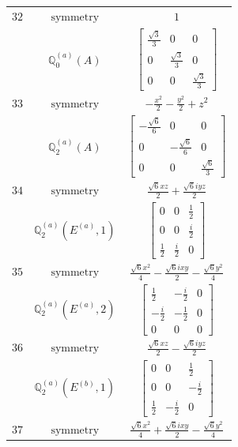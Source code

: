 \documentclass[fleqn,8pt,landscape]{jsarticle}
\begin{document}
\begin{longtable}{ccc}
$ 32 $ & $ \text{symmetry} $ & $ 1 $ \\
$  $ & $ \mathbb{Q}_{0}^{(a)}(A) $ & $ \begin{bmatrix} \frac{\sqrt{3}}{3} & 0 & 0 \\ 0 & \frac{\sqrt{3}}{3} & 0 \\ 0 & 0 & \frac{\sqrt{3}}{3} \end{bmatrix} $ \\ \hline
$ 33 $ & $ \text{symmetry} $ & $ - \frac{x^{2}}{2} - \frac{y^{2}}{2} + z^{2} $ \\
$  $ & $ \mathbb{Q}_{2}^{(a)}(A) $ & $ \begin{bmatrix} - \frac{\sqrt{6}}{6} & 0 & 0 \\ 0 & - \frac{\sqrt{6}}{6} & 0 \\ 0 & 0 & \frac{\sqrt{6}}{3} \end{bmatrix} $ \\ \hline
$ 34 $ & $ \text{symmetry} $ & $ \frac{\sqrt{6} x z}{2} + \frac{\sqrt{6} i y z}{2} $ \\
$  $ & $ \mathbb{Q}_{2}^{(a)}(E^{(a)},1) $ & $ \begin{bmatrix} 0 & 0 & \frac{1}{2} \\ 0 & 0 & \frac{i}{2} \\ \frac{1}{2} & \frac{i}{2} & 0 \end{bmatrix} $ \\ \hline
$ 35 $ & $ \text{symmetry} $ & $ \frac{\sqrt{6} x^{2}}{4} - \frac{\sqrt{6} i x y}{2} - \frac{\sqrt{6} y^{2}}{4} $ \\
$  $ & $ \mathbb{Q}_{2}^{(a)}(E^{(a)},2) $ & $ \begin{bmatrix} \frac{1}{2} & - \frac{i}{2} & 0 \\ - \frac{i}{2} & - \frac{1}{2} & 0 \\ 0 & 0 & 0 \end{bmatrix} $ \\ \hline
$ 36 $ & $ \text{symmetry} $ & $ \frac{\sqrt{6} x z}{2} - \frac{\sqrt{6} i y z}{2} $ \\
$  $ & $ \mathbb{Q}_{2}^{(a)}(E^{(b)},1) $ & $ \begin{bmatrix} 0 & 0 & \frac{1}{2} \\ 0 & 0 & - \frac{i}{2} \\ \frac{1}{2} & - \frac{i}{2} & 0 \end{bmatrix} $ \\ \hline
$ 37 $ & $ \text{symmetry} $ & $ \frac{\sqrt{6} x^{2}}{4} + \frac{\sqrt{6} i x y}{2} - \frac{\sqrt{6} y^{2}}{4} $ \\

\end{longtable}
\end{document}
